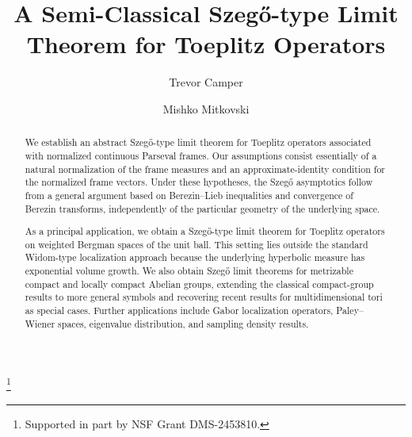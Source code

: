 \documentclass{amsart}
\theoremstyle{definition}
\theoremstyle{remark}
\numberwithin{equation}{section}
\begin{document}

\title{A Semi-Classical Szeg\H{o}-type Limit Theorem for Toeplitz Operators}


\author{Trevor Camper}
\address{Department of Mathematics, Dartmouth College,
Hanover, NH 03755}


\author{Mishko Mitkovski}\thanks{Supported in part by NSF Grant DMS-2453810.}
\address{School of Mathematical and Statistical Sciences, Clemson University,
Clemson, SC 29630}




\begin{abstract}
We establish an abstract Szeg\H{o}-type limit theorem for Toeplitz operators associated with normalized continuous Parseval frames. Our assumptions consist essentially of a natural normalization of the frame measures and an approximate-identity condition for the normalized frame vectors. Under these hypotheses, the Szeg\H{o} asymptotics follow from a general argument based on Berezin--Lieb inequalities and
convergence of Berezin transforms, independently of the particular geometry of the underlying space.

As a principal application, we obtain a Szeg\H{o}-type limit theorem for Toeplitz operators on weighted Bergman spaces of the unit ball. This setting lies outside the standard Widom-type localization approach because the underlying hyperbolic measure has exponential volume growth. We also obtain Szeg\H{o} limit theorems for metrizable compact and locally compact Abelian groups, extending the classical compact-group results to more general symbols and recovering recent results for multidimensional tori as special cases. Further
applications include Gabor localization operators, Paley--Wiener spaces, eigenvalue distribution, and sampling density results.

\end{abstract}

\end{document}
